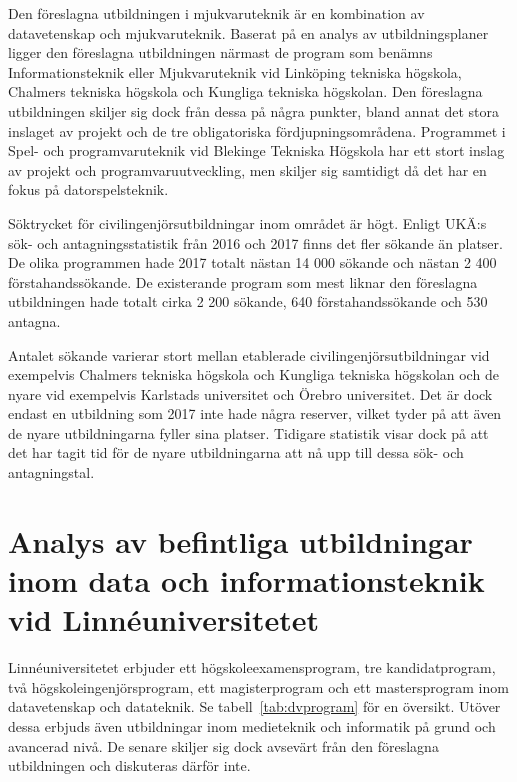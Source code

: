Den föreslagna utbildningen i mjukvaruteknik är en kombination av datavetenskap och mjukvaruteknik. Baserat på en analys av utbildningsplaner ligger den föreslagna utbildningen närmast de program som benämns Informationsteknik eller Mjukvaruteknik vid Linköping tekniska högskola, Chalmers tekniska högskola och Kungliga tekniska högskolan. Den föreslagna utbildningen skiljer sig dock från dessa på några punkter, bland annat det stora inslaget av projekt och de tre obligatoriska fördjupningsområdena. Programmet i Spel- och programvaruteknik vid Blekinge Tekniska Högskola har ett stort inslag av projekt och programvaruutveckling, men skiljer sig samtidigt då det har en fokus på datorspelsteknik.

Söktrycket för civilingenjörsutbildningar inom området är högt. Enligt UKÄ:s sök- och antagningsstatistik från 2016 och 2017 finns det fler sökande än platser. De olika programmen hade 2017 totalt nästan 14 000 sökande och nästan 2 400 förstahandssökande. De existerande program som mest liknar den föreslagna utbildningen hade totalt cirka 2 200 sökande, 640 förstahandssökande och 530 antagna.

Antalet sökande varierar stort mellan etablerade civilingenjörsutbildningar vid exempelvis Chalmers tekniska högskola och Kungliga tekniska högskolan och de nyare vid exempelvis Karlstads universitet och Örebro universitet. Det är dock endast en utbildning som 2017 inte hade några reserver, vilket tyder på att även de nyare utbildningarna fyller sina platser. Tidigare statistik visar dock på att det har tagit tid för de nyare utbildningarna att nå upp till dessa sök- och antagningstal.


\section{Analys av befintliga utbildningar inom data och informationsteknik vid Linnéuniversitetet}\label{sec:analysbefintlnu}

Linnéuniversitetet erbjuder ett högskoleexamensprogram, tre kandidatprogram, två högskoleingenjörsprogram, ett magisterprogram och ett mastersprogram inom datavetenskap och datateknik. Se tabell~\ref{tab:dvprogram} för en översikt. Utöver dessa erbjuds även utbildningar inom medieteknik och informatik på grund och avancerad nivå. De senare skiljer sig dock avsevärt från den föreslagna utbildningen och diskuteras därför inte.


